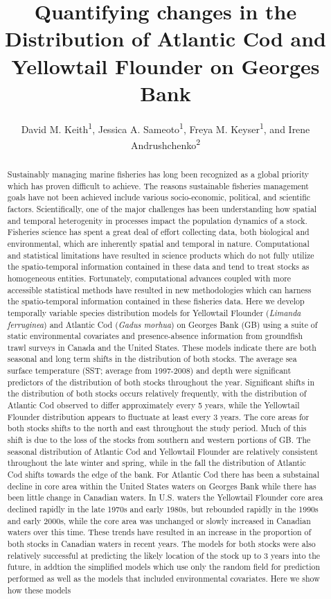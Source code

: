 \documentclass[
]{article}
\title{Quantifying changes in the Distribution of Atlantic Cod and Yellowtail Flounder on Georges Bank}
\author{David M. Keith\textsuperscript{1},
Jessica A. Sameoto\textsuperscript{1},
Freya M. Keyser\textsuperscript{1}, and
Irene Andrushchenko\textsuperscript{2}}
\date{}
\begin{document}
\maketitle
\begin{abstract}
Sustainably managing marine fisheries has long been recognized as a global priority which has proven difficult to achieve. The reasons sustainable fisheries management goals have not been achieved include various socio-economic, political, and scientific factors. Scientifically, one of the major challenges has been understanding how spatial and temporal heterogenity in processes impact the population dynamics of a stock. Fisheries science has spent a great deal of effort collecting data, both biological and environmental, which are inherently spatial and temporal in nature. Computational and statistical limitations have resulted in science products which do not fully utilize the spatio-temporal information contained in these data and tend to treat stocks as homogeneous entities. Fortunately, computational advances coupled with more accessible statistical methods have resulted in new methodologies which can harness the spatio-temporal information contained in these fisheries data. Here we develop temporally variable species distribution models for Yellowtail Flounder (\emph{Limanda ferruginea}) and Atlantic Cod (\emph{Gadus morhua}) on Georges Bank (GB) using a suite of static environmental covariates and presence-absence information from groundfish trawl surveys in Canada and the United States. These models indicate there are both seasonal and long term shifts in the distribution of both stocks. The average sea surface temperature (SST; average from 1997-2008) and depth were significant predictors of the distribution of both stocks throughout the year. Significant shifts in the distribution of both stocks occurs relatively frequently, with the distribution of Atlantic Cod observed to differ approximately every 5 years, while the Yellowtail Flounder distribution appears to fluctuate at least every 3 years. The core areas for both stocks shifts to the north and east throughout the study period. Much of this shift is due to the loss of the stocks from southern and western portions of GB. The seasonal distribution of Atlantic Cod and Yellowtail Flounder are relatively consistent throughout the late winter and spring, while in the fall the distribution of Atlantic Cod shifts towards the edge of the bank. For Atlantic Cod there has been a substainal decline in core area within the United States waters on Georges Bank while there has been little change in Canadian waters. In U.S. waters the Yellowtail Flounder core area declined rapidly in the late 1970s and early 1980s, but rebounded rapidly in the 1990s and early 2000s, while the core area was unchanged or slowly increased in Canadian waters over this time. These trends have resulted in an increase in the proportion of both stocks in Canadian waters in recent years. The models for both stocks were also relatively successful at predicting the likely location of the stock up to 3 years into the future, in addtion the simplified models which use only the random field for prediction performed as well as the models that included environmental covariates. Here we show how these models 
\end{abstract}
\end{document}
